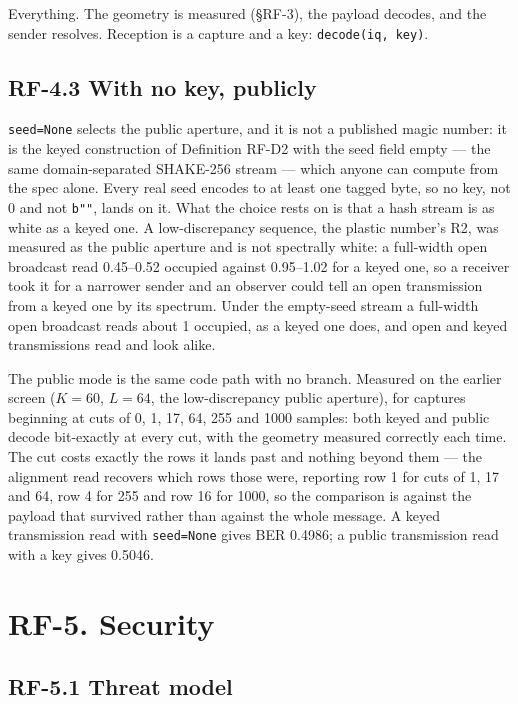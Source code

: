 \documentclass[10pt,letterpaper,twocolumn]{article}
\begin{document}
Everything. The geometry is measured (§RF-3), the payload decodes, and the sender resolves. Reception is a capture and a key: \texttt{decode(\allowbreak{}iq,\allowbreak{}\ key)\allowbreak{}}.

\subsection{RF-4.3 With no key, publicly}\label{rf-43-with-no-key-publicly}

\texttt{seed=\allowbreak{}None} selects the public aperture, and it is not a published magic number: it is the keyed construction of Definition RF-D2 with the seed field empty --- the same domain-separated SHAKE-256 stream --- which anyone can compute from the spec alone. Every real seed encodes to at least one tagged byte, so no key, not 0 and not \texttt{b""}, lands on it. What the choice rests on is that a hash stream is as white as a keyed one. A low-discrepancy sequence, the plastic number's R2, was measured as the public aperture and is not spectrally white: a full-width open broadcast read 0.45--0.52 occupied against 0.95--1.02 for a keyed one, so a receiver took it for a narrower sender and an observer could tell an open transmission from a keyed one by its spectrum. Under the empty-seed stream a full-width open broadcast reads about 1 occupied, as a keyed one does, and open and keyed transmissions read and look alike.

The public mode is the same code path with no branch. Measured on the earlier screen (\(K=60\), \(L=64\), the low-discrepancy public aperture), for captures beginning at cuts of 0, 1, 17, 64, 255 and 1000 samples: both keyed and public decode bit-exactly at every cut, with the geometry measured correctly each time. The cut costs exactly the rows it lands past and nothing beyond them --- the alignment read recovers which rows those were, reporting row 1 for cuts of 1, 17 and 64, row 4 for 255 and row 16 for 1000, so the comparison is against the payload that survived rather than against the whole message. A keyed transmission read with \texttt{seed=\allowbreak{}None} gives BER 0.4986; a public transmission read with a key gives 0.5046.

\section{RF-5. Security}\label{rf-5-security}

\subsection{RF-5.1 Threat model}\label{rf-51-threat-model}
\end{document}
